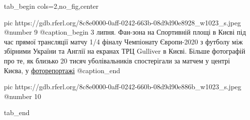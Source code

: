  
 
 
 
 


\ifcmt
  tab_begin cols=2,no_fig,center

     pic https://gdb.rferl.org/8c8e0000-0aff-0242-663b-08d9d90e8928_w1023_s.jpeg
		 @number 9
		 @caption_begin
3 липня. Фан-зона на Спортивній площі в Києві під час прямої трансляції
матчу 1/4 фіналу Чемпіонату Європи-2020 з футболу між збірними України
та Англії на екранах ТРЦ Gulliver в Києві. Більше фотографій про те, як
близько 20 тисяч уболівальників спостерігали за матчем у центрі Києва, у
\href{https://www.radiosvoboda.org/a/photo-vbolivalnyky/31339971.html}{фоторепортажі}
		 @caption_end

		 pic https://gdb.rferl.org/8c8e0000-0aff-0242-660b-08d9d90e886b_w1023_s.jpeg
		 @number 10

  tab_end
\fi
